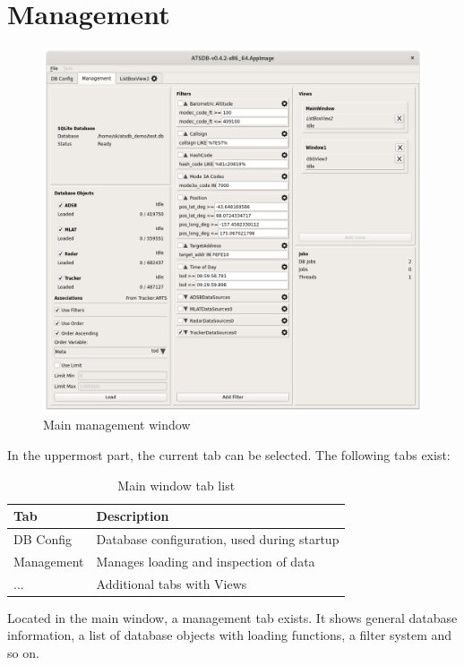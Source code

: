 \section{Management}
\label{sec:management}

\begin{figure}[H]
  \hspace*{-2cm}
    \includegraphics[width=18cm]{../screenshots/management.png}
  \caption{Main management window}
  \label{fig:management}
\end{figure}

In the uppermost part, the current tab can be selected. The following tabs exist:

\begin{table}[h]
  \center
  \begin{tabular}{ | l | l |}
    \hline
    \textbf{Tab} & \textbf{Description} \\ \hline
    DB Config & Database configuration, used during startup \\ \hline
    Management & Manages loading and inspection of data \\ \hline
    ... & Additional tabs with Views \\
    \hline
  \end{tabular}
  \caption{Main window tab list}
\end{table}

Located in the main window, a management tab exists.  It shows general database information, a list of database objects with loading functions, a filter system and so on.

